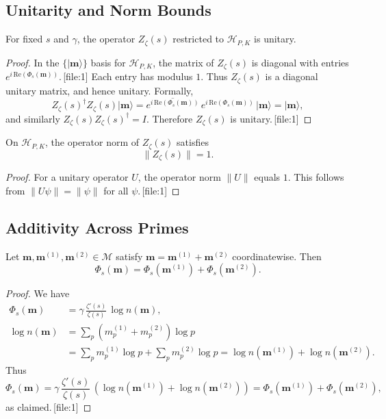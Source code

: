 \documentclass[11pt]{article}
\begin{document}
\subsection{Unitarity and Norm Bounds}

\begin{lemma}
For fixed \(s\) and \(\gamma\), the operator \(Z_\zeta(s)\) restricted to \(\mathcal{H}_{P,K}\) is unitary.
\end{lemma}

\begin{proof}
In the \(\{\lvert \mathbf{m} \rangle\}\) basis for \(\mathcal{H}_{P,K}\), the matrix of \(Z_\zeta(s)\) is diagonal with entries \(e^{i\,\mathrm{Re}(\Phi_s(\mathbf{m}))}\).\,[file:1] Each entry has modulus \(1\). Thus \(Z_\zeta(s)\) is a diagonal unitary matrix, and hence unitary. Formally,
\[
Z_\zeta(s)^\dagger Z_\zeta(s) \lvert \mathbf{m} \rangle
= \overline{e^{i\,\mathrm{Re}(\Phi_s(\mathbf{m}))}}\, e^{i\,\mathrm{Re}(\Phi_s(\mathbf{m}))}\, \lvert \mathbf{m} \rangle
= \lvert \mathbf{m} \rangle,
\]
and similarly \(Z_\zeta(s) Z_\zeta(s)^\dagger = I\). Therefore \(Z_\zeta(s)\) is unitary.\,[file:1]
\end{proof}

\begin{corollary}
On \(\mathcal{H}_{P,K}\), the operator norm of \(Z_\zeta(s)\) satisfies
\[
\|Z_\zeta(s)\| = 1.
\]
\end{corollary}

\begin{proof}
For a unitary operator \(U\), the operator norm \(\|U\|\) equals \(1\). This follows from \(\|U\psi\| = \|\psi\|\) for all \(\psi\).\,[file:1]
\end{proof}

\subsection{Additivity Across Primes}

\begin{lemma}
Let \(\mathbf{m}, \mathbf{m}^{(1)}, \mathbf{m}^{(2)} \in \mathcal{M}\) satisfy \(\mathbf{m} = \mathbf{m}^{(1)} + \mathbf{m}^{(2)}\) coordinatewise. Then
\[
\Phi_s(\mathbf{m}) = \Phi_s(\mathbf{m}^{(1)}) + \Phi_s(\mathbf{m}^{(2)}).
\]
\end{lemma}

\begin{proof}
We have
\begin{align*}
\Phi_s(\mathbf{m}) &= \gamma\,\frac{\zeta'(s)}{\zeta(s)}\,\log n(\mathbf{m}),\\
\log n(\mathbf{m}) &= \sum_p (m^{(1)}_p + m^{(2)}_p)\log p \\
&= \sum_p m^{(1)}_p \log p + \sum_p m^{(2)}_p \log p = \log n(\mathbf{m}^{(1)}) + \log n(\mathbf{m}^{(2)}).
\end{align*}
Thus
\[
\Phi_s(\mathbf{m}) = \gamma\,\frac{\zeta'(s)}{\zeta(s)}\,\left(\log n(\mathbf{m}^{(1)}) + \log n(\mathbf{m}^{(2)})\right)
= \Phi_s(\mathbf{m}^{(1)}) + \Phi_s(\mathbf{m}^{(2)}),
\]
as claimed.\,[file:1]
\end{proof}
\end{document}
